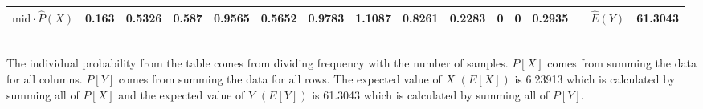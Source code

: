 \begin{table}[ht]
\begin{adjustbox}{width = \textwidth, center}
\begin{tabular}{|cc|r|r|r|r|r|r|r|r|r|r|r|r|r|r|r|}
            \multicolumn{2}{|c|}{\cellcolor[HTML]{FCE5CD}$\mathrm{mid}\cdot\widehat{P}(X)$} & \cellcolor[HTML]{FCE5CD}0.163                  & \cellcolor[HTML]{FCE5CD}0.5326                 & \cellcolor[HTML]{FCE5CD}0.587                  & \cellcolor[HTML]{FCE5CD}0.9565                 & \cellcolor[HTML]{FCE5CD}0.5652                 & \cellcolor[HTML]{FCE5CD}0.9783                 & \cellcolor[HTML]{FCE5CD}1.1087                 & \cellcolor[HTML]{FCE5CD}0.8261                  & \cellcolor[HTML]{FCE5CD}0.2283                  & \cellcolor[HTML]{FCE5CD}0                       & \cellcolor[HTML]{FCE5CD}0                       & \cellcolor[HTML]{FCE5CD}0.2935                  & \multicolumn{1}{l|}{}                                                           & \multicolumn{1}{c|}{\cellcolor[HTML]{C9DAF8}$\widehat{E}(Y)$}           & \cellcolor[HTML]{C9DAF8}61.3043                                                                  \\ \hline
        \end{tabular}
    \end{adjustbox}
\end{table}\\
The individual probability from the table comes from dividing frequency with the number of samples. $P[X]$ comes from summing the data for all columns. $P[Y]$ comes from summing the data for all rows. The expected value of $X$ $(E[X])$ is 6.23913 which is calculated by summing all of $P[X]$ and the expected value of $Y$ $(E[Y])$ is 61.3043 which is calculated by summing all of $P[Y]$.\\
